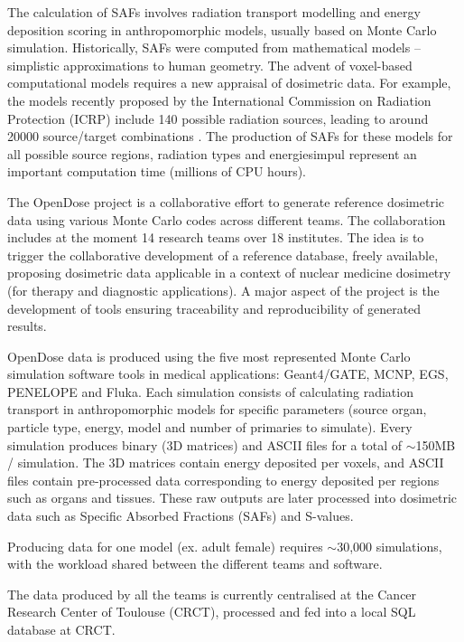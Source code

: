   The calculation of SAFs involves radiation transport modelling and energy
  deposition scoring in anthropomorphic models, usually based on Monte Carlo
  simulation. Historically, SAFs were computed from mathematical models --
  simplistic approximations to human geometry. The advent of voxel-based
  computational models requires a new appraisal of dosimetric data. For
  example, the models recently proposed by the International Commission on
  Radiation Protection (ICRP) include 140 possible radiation sources, leading
  to around 20000 source/target combinations \cite{ICRP2009ICRPPhantoms}. The
  production of SAFs for these models for all possible source regions,
  radiation types and energiesimpul represent an important computation time
  (millions of CPU hours).

  The OpenDose project \cite{Chauvin2017} is a collaborative effort to generate
  reference dosimetric data using various Monte Carlo codes across different
  teams. The collaboration includes at the moment 14 research teams over 18
  institutes.  The idea is to trigger the collaborative development of a
  reference database, freely available, proposing dosimetric data applicable in
  a context of nuclear medicine dosimetry (for therapy and diagnostic
  applications). A major aspect of the project is the development of tools
  ensuring traceability and reproducibility of generated results.

  OpenDose data is produced using the five most represented Monte Carlo
  simulation software tools in medical applications: Geant4/GATE, MCNP, EGS, PENELOPE
  and Fluka. Each simulation consists of calculating radiation transport in
  anthropomorphic models for specific parameters (source organ, particle type,
  energy, model and number of primaries to simulate). Every simulation produces
  binary (3D matrices) and ASCII files for a total of $\sim$150MB / simulation.
  The 3D matrices contain energy deposited per voxels, and ASCII files contain
  pre-processed data corresponding to energy deposited per regions such as
  organs and tissues. These raw outputs are later processed into dosimetric
  data such as Specific Absorbed Fractions (SAFs) and S-values.

  Producing data for one model (ex. adult female) requires $\sim$30,000
  simulations, with the workload shared between the different teams and
  software.

  The data produced by all the teams is currently centralised at the Cancer
  Research Center of Toulouse (CRCT), processed and fed into a local SQL
  database at CRCT.

